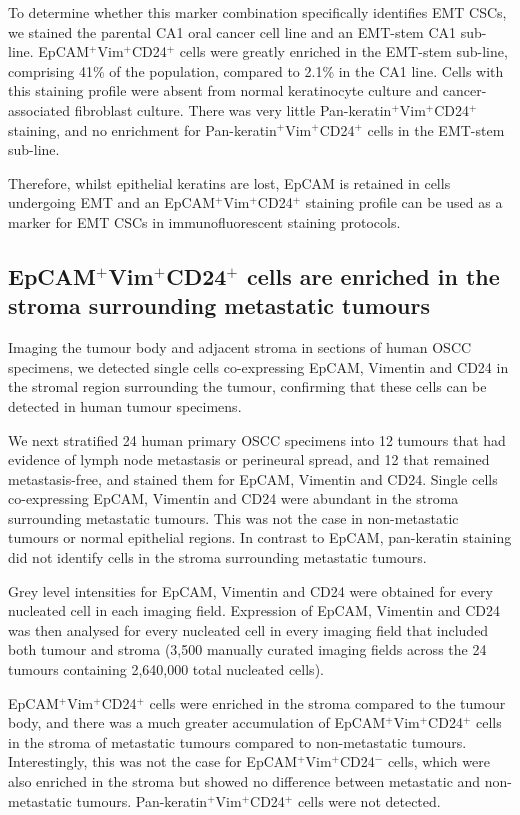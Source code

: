 \documentclass[11pt]{article}
\begin{document}
To determine whether this marker combination specifically identifies EMT CSCs, we stained the parental CA1 oral cancer cell line and an EMT-stem CA1 sub-line. EpCAM$^+$Vim$^+$CD24$^+$ cells were greatly enriched in the EMT-stem sub-line, comprising 41\% of the population, compared to 2.1\% in the CA1 line. Cells with this staining profile were absent from normal keratinocyte culture and cancer-associated fibroblast culture. There was very little Pan-keratin$^+$Vim$^+$CD24$^+$ staining, and no enrichment for Pan-keratin$^+$Vim$^+$CD24$^+$ cells in the EMT-stem sub-line.

Therefore, whilst epithelial keratins are lost, EpCAM is retained in cells undergoing EMT and an EpCAM$^+$Vim$^+$CD24$^+$ staining profile can be used as a marker for EMT CSCs in immunofluorescent staining protocols.

\subsection{EpCAM$^+$Vim$^+$CD24$^+$ cells are enriched in the stroma surrounding metastatic tumours}

Imaging the tumour body and adjacent stroma in sections of human OSCC specimens, we detected single cells co-expressing EpCAM, Vimentin and CD24 in the stromal region surrounding the tumour, confirming that these cells can be detected in human tumour specimens.

We next stratified 24 human primary OSCC specimens into 12 tumours that had evidence of lymph node metastasis or perineural spread, and 12 that remained metastasis-free, and stained them for EpCAM, Vimentin and CD24. Single cells co-expressing EpCAM, Vimentin and CD24 were abundant in the stroma surrounding metastatic tumours. This was not the case in non-metastatic tumours or normal epithelial regions. In contrast to EpCAM, pan-keratin staining did not identify cells in the stroma surrounding metastatic tumours.

Grey level intensities for EpCAM, Vimentin and CD24 were obtained for every nucleated cell in each imaging field. Expression of EpCAM, Vimentin and CD24 was then analysed for every nucleated cell in every imaging field that included both tumour and stroma (3,500 manually curated imaging fields across the 24 tumours containing 2,640,000 total nucleated cells).

EpCAM$^+$Vim$^+$CD24$^+$ cells were enriched in the stroma compared to the tumour body, and there was a much greater accumulation of EpCAM$^+$Vim$^+$CD24$^+$ cells in the stroma of metastatic tumours compared to non-metastatic tumours. Interestingly, this was not the case for EpCAM$^+$Vim$^+$CD24$^-$ cells, which were also enriched in the stroma but showed no difference between metastatic and non-metastatic tumours. Pan-keratin$^+$Vim$^+$CD24$^+$ cells were not detected.
\end{document}
